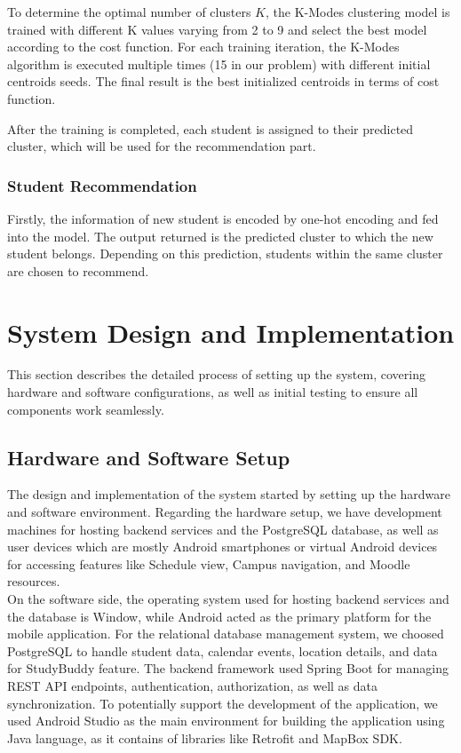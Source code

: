 \documentclass[12pt]{article}
\begin{document}
To determine the optimal number of clusters $K$, the K-Modes clustering model is trained with different K values varying from 2 to 9 and select the best model according to the cost function. For each training iteration, the K-Modes algorithm is executed multiple times (15 in our problem) with different initial centroids seeds. The final result is the best initialized centroids in terms of cost function.\citep{devos2015}

After the training is completed, each student is assigned to their predicted cluster, which will be used for the recommendation part.

\subsubsection{Student Recommendation}
Firstly, the information of new student is encoded by one-hot encoding and fed into the model. The output returned is the predicted cluster to which the new student belongs. Depending on this prediction, students within the same cluster are chosen to recommend.

\pagebreak

\section{System Design and Implementation}  
This section describes the detailed process of setting up the system, covering hardware and software configurations, as well as initial testing to ensure all components work seamlessly.
\subsection{Hardware and Software Setup}  
The design and implementation of the system started by setting up the hardware and software environment. Regarding the hardware setup, we have development machines for hosting backend services and the PostgreSQL database, as well as user devices which are mostly Android smartphones or virtual Android devices for accessing features like Schedule view, Campus navigation, and Moodle resources. \\

On the software side, the operating system used for hosting backend services and the database is Window, while Android acted as the primary platform for the mobile application.
For the relational database management system, we choosed PostgreSQL to handle student data, calendar events, location details, and data for StudyBuddy feature.
The backend framework used Spring Boot for managing REST API endpoints, authentication, authorization, as well as data synchronization.
To potentially support the development of the application, we used Android Studio as the main environment for building the application using Java language, as it contains of libraries like Retrofit and MapBox SDK.
\end{document}
